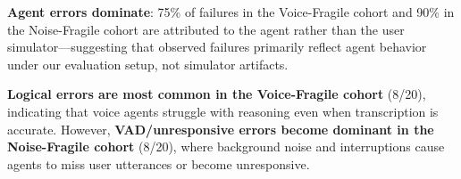 \textbf{Agent errors dominate}: 75\% of failures in the Voice-Fragile cohort and 90\% in the Noise-Fragile cohort are attributed to the agent rather than the user simulator---suggesting that observed failures primarily reflect agent behavior under our evaluation setup, not simulator artifacts.

\textbf{Logical errors are most common in the Voice-Fragile cohort} (8/20), indicating that voice agents struggle with reasoning even when transcription is accurate. However, \textbf{VAD/unresponsive errors become dominant in the Noise-Fragile cohort} (8/20), where background noise and interruptions cause agents to miss user utterances or become unresponsive.
